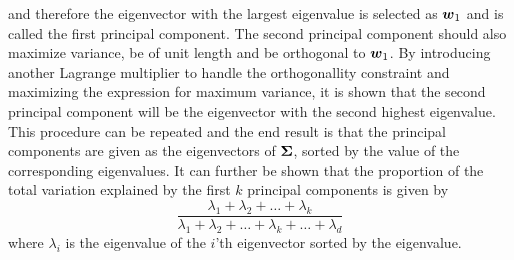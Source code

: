 and therefore the eigenvector with the largest eigenvalue is selected as $\boldsymbol{w}_1$ and is called the first principal component. The second principal component should also maximize variance, be of unit length and be orthogonal to $\boldsymbol{w}_1$. By introducing another Lagrange multiplier to handle the orthogonallity constraint and maximizing the expression for maximum variance, it is shown that the second principal component will be the eigenvector with the second highest eigenvalue. This procedure can be repeated and the end result is that the principal components are given as the eigenvectors of $\boldsymbol{\Sigma}$, sorted by the value of the corresponding eigenvalues. It can further be shown that the proportion of the total variation explained by the first $k$ principal components is given by
\begin{equation}\label{eq:variance-explained}
    \frac{\lambda_1+\lambda_2 +\dots + \lambda_k}{\lambda_1 + \lambda_2 + \dots + \lambda_k + \dots + \lambda_d}
\end{equation}
where $\lambda_i$ is the eigenvalue of the $i$'th eigenvector sorted by the eigenvalue.


